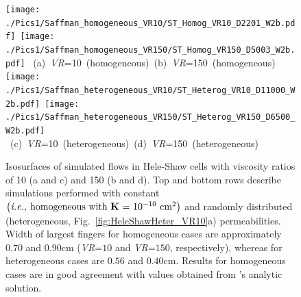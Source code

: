 \begin{figure}[ht]
\vbox{
\hbox{\texttt{[image: ./Pics1/Saffman\_homogeneous\_VR10/ST\_Homog\_VR10\_D2201\_W2b.pdf]}
       \texttt{[image: ./Pics1/Saffman\_homogeneous\_VR150/ST\_Homog\_VR150\_D5003\_W2b.pdf]}}
\hbox{\hspace{0.25cm} (a) {\it VR}=10 (homogeneous) \hspace{1.5cm} (b) {\it VR}=150 (homogeneous) }
\vspace{0.5cm}
\hbox{\texttt{[image: ./Pics1/Saffman\_heterogeneous\_VR10/ST\_Heterog\_VR10\_D11000\_W2b.pdf]}
       \texttt{[image: ./Pics1/Saffman\_heterogeneous\_VR150/ST\_Heterog\_VR150\_D6500\_W2b.pdf]}}
\hbox{\hspace{0.25cm} (c) {\it VR}=10 (heterogeneous) \hspace{1.5cm} (d) {\it VR}=150 (heterogeneous) }
}
\caption{Isosurfaces of simulated flows in Hele-Shaw cells with viscosity ratios of 10 (a and c) and 150 (b and d). Top and bottom rows describe simulations performed with constant $\left(\text{{\it i.e., }homogeneous with }\textbf{K}\text{ = 10}^{-10}\text{ cm}^{2}\right)$ and randomly distributed (\ie heterogeneous, Fig.~\ref{fig:HeleShawHeter_VR10}a) permeabilities. Width of largest fingers for homogeneous cases are approximately $0.70$ and $0.90$cm (\textit{VR}=$10$ and \textit{VR}=$150$, respectively), whereas for heterogeneous cases are $0.56$ and $0.40$cm. Results for homogeneous cases are in good agreement with values obtained from \citet{guan_2003}'s analytic solution.}
\label{fig:homoheleshaw_VN10_VN150}
\end{figure}
\clearpage




